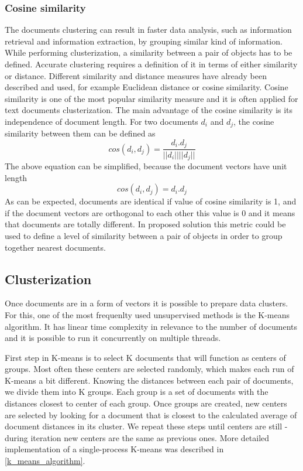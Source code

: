 \subsubsection{Cosine similarity}
 The documents clustering can result in faster data analysis, such  as  information retrieval  and  information  extraction,  by  grouping  similar kind  of  information. While performing clusterization, a similarity between a pair of objects has to be defined. Accurate clustering requires a definition of it in terms of either similarity or distance. Different similarity and distance measures have already been described and used, for example Euclidean  distance or cosine  similarity. Cosine  similarity  is  one  of  the  most  popular  similarity  measure and it is often  applied for  text  documents clusterization. The main advantage of the cosine similarity is its independence of document length. For two documents \(d_i\) and \(d_j\), the cosine similarity between them can be defined as
\[cos(d_i, d_j)=\frac{d_i . d_j}{|| d_i || ||d_j ||}\]
The above equation can be simplified, because the document vectors have unit length
\[cos(d_i, d_j)={d_i . d_j}\]
As can be expected, documents are identical if value of cosine similarity is 1, and if the 
document vectors are orthogonal to each other this value is 0 and it means that documents are totally different.
In proposed solution this metric could be used to define a level of similarity between a pair of objects in order to group together nearest documents.
\subsection{Clusterization}
Once documents are in a form of vectors it is possible to prepare data clusters. For this, one of the most frequenlty used unsupervised methods is the K-means algorithm. It has linear time complexity in relevance to the number of documents and it is possible to run it concurrently on multiple threads. 

First step in K-means is to select K documents that will function as centers of groups. Most often these centers are selected randomly, which makes each run of K-means a bit different.
Knowing the distances between each pair of documents, we divide them into K groups. Each group is a set of documents with the distances closest to center of each group. Once groups are created, new centers are selected by looking for a document that is closest to the calculated average of document distances in its cluster. We repeat these steps until centers are still - during iteration new centers are the same as previous ones. 
More detailed implementation of a single-process K-means was described in \ref{k_means_algorithm}.

